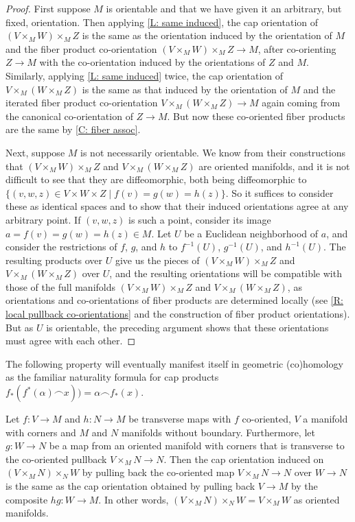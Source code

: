 \begin{proof}
	First suppose $M$ is orientable and that we have given it an arbitrary, but fixed, orientation.
	Then applying \cref{L: same induced}, the cap orientation of $(V \times_M W) \times_M Z$ is the same as the orientation induced by the orientation of $M$ and the fiber product co-orientation $(V \times_M W) \times_M Z \to M$, after co-orienting $Z \to M$ with the co-orientation induced by the orientations of $Z$ and $M$.
	Similarly, applying \cref{L: same induced} twice, the cap orientation of $V \times_M (W \times_M Z)$ is the same as that induced by the orientation of $M$ and the iterated fiber product co-orientation $V \times_M (W \times_M Z) \to M$ again coming from the canonical co-orientation of $Z \to M$.
	But now these co-oriented fiber products are the same by \cref{C: fiber assoc}.

	Next, suppose $M$ is not necessarily orientable.
	We know from their constructions that $(V \times_M W) \times_M Z$ and $V \times_M (W \times_M Z)$ are oriented manifolds, and it is not difficult to see that they are diffeomorphic, both being diffeomorphic to $\{(v,w,z) \in V \times W \times Z \mid f(v) = g(w) = h(z)\}$.
	So it suffices to consider these as identical spaces and to show that their induced orientations agree at any arbitrary point.
	If $(v,w,z)$ is such a point, consider its image $a = f(v) = g(w) = h(z) \in M$.
	Let $U$ be a Euclidean neighborhood of $a$, and consider the restrictions of $f$, $g$, and $h$ to $f^{-1}(U)$, $g^{-1}(U)$, and $h^{-1}(U)$.
	The resulting products over $U$ give us the pieces of $(V \times_M W) \times_M Z$ and $V \times_M (W \times_M Z)$ over $U$, and the resulting orientations will be compatible with those of the full manifolds $(V \times_M W) \times_M Z$ and $V \times_M (W \times_M Z)$, as orientations and co-orientations of fiber products are determined locally (see \cref{R: local pullback co-orientations} and the construction of fiber product orientations).
	But as $U$ is orientable, the preceding argument shows that these orientations must agree with each other.
\end{proof}

The following property will eventually manifest itself in geometric (co)homology as the familiar naturality formula for cap products $f_*(f^*(\alpha)\frown x)) = \alpha\frown f_*(x)$.

\begin{proposition}\label{P: natural cap}
	Let $f \colon V \to M$ and $h \colon N \to M$ be transverse maps with $f$ co-oriented, $V$ a manifold with corners and $M$ and $N$ manifolds without boundary.
	Furthermore, let $g \colon W \to N$ be a map from an oriented manifold with corners that is transverse to the co-oriented pullback $V \times_M N \to N$.
	Then the cap orientation induced on $(V \times_M N) \times_N W$ by pulling back the co-oriented map $V \times_M N \to N$ over $W \to N$
	is the same as the cap orientation obtained by pulling back $V \to M$ by the composite $hg \colon W \to M$.
	In other words, $(V \times_M N) \times_N W = V \times_M W$ as oriented manifolds.
\end{proposition}

